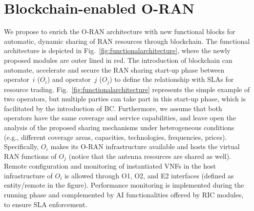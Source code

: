 \documentclass[journal]{IEEEtran}
\begin{document}
	\section{Blockchain-enabled O-RAN}
	\label{section:architecture}
	We propose to enrich the O-RAN architecture with new functional blocks for automatic, dynamic sharing of RAN resources through blockchain. The functional architecture is depicted in Fig.~\ref{fig:functionalarchitecture}, where the newly proposed modules are outer lined in red. The introduction of blockchain can automate, accelerate and secure the RAN sharing start-up phase between operator~$i$ ($O_i$) and operator~$j$ ($O_j$) to define the relationship with SLAs for resource trading. Fig.~\ref{fig:functionalarchitecture} represents the simple example of two operators, but multiple parties can take part in this start-up phase, which is facilitated by the introduction of BC. Furthermore, we assume that both operators have the same coverage and service capabilities, and leave open the analysis of the proposed sharing mechanisms under heterogeneous conditions (e.g., different coverage areas, capacities, technologies, frequencies, prices). Specifically, $O_i$ makes its {O-RAN} infrastructure available and hosts the virtual RAN functions of $O_j$ (notice that the antenna resources are shared as well). Remote configuration and monitoring of instantiated VNFs in the host infrastructure of $O_i$ is allowed through O1, O2, and E2 interfaces (defined as entity/remote in the figure). Performance monitoring is implemented during the running phase and complemented by AI functionalities offered by RIC modules, to ensure SLA enforcement. 
	
\end{document}
